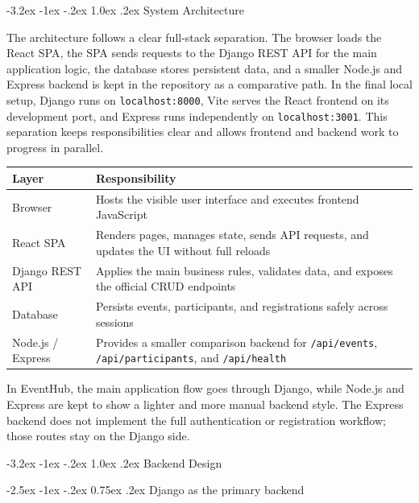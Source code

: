 \documentclass[11pt,a4paper]{article}
\makeatletter
\renewcommand\section{\@startsection{section}{1}{\z@}%
  {-3.2ex \@plus -1ex \@minus -.2ex}%
  {1.0ex \@plus .2ex}%
  {\normalfont\Large\sffamily\bfseries\color{ink}}}
\renewcommand\subsection{\@startsection{subsection}{2}{\z@}%
  {-2.5ex \@plus -1ex \@minus -.2ex}%
  {0.75ex \@plus .2ex}%
  {\normalfont\large\sffamily\bfseries\color{MidnightBlue}}}
\makeatother
\begin{document}
\section{System Architecture}

The architecture follows a clear full-stack separation. The browser loads the React SPA, the SPA sends requests to the Django REST API for the main application logic, the database stores persistent data, and a smaller Node.js and Express backend is kept in the repository as a comparative path. In the final local setup, Django runs on \texttt{localhost:8000}, Vite serves the React frontend on its development port, and Express runs independently on \texttt{localhost:3001}. This separation keeps responsibilities clear and allows frontend and backend work to progress in parallel.


\begin{center}
\begin{tabularx}{\textwidth}{@{}lY@{}}
\toprule
\textbf{Layer} & \textbf{Responsibility} \\
\midrule
Browser & Hosts the visible user interface and executes frontend JavaScript \\
React SPA & Renders pages, manages state, sends API requests, and updates the UI without full reloads \\
Django REST API & Applies the main business rules, validates data, and exposes the official CRUD endpoints \\
Database & Persists events, participants, and registrations safely across sessions \\
Node.js / Express & Provides a smaller comparison backend for \texttt{/api/events}, \texttt{/api/participants}, and \texttt{/api/health} \\
\bottomrule
\end{tabularx}
\end{center}

In EventHub, the main application flow goes through Django, while Node.js and Express are kept to show a lighter and more manual backend style. The Express backend does not implement the full authentication or registration workflow; those routes stay on the Django side.

\section{Backend Design}

\subsection{Django as the primary backend}
\end{document}
